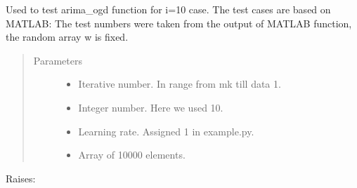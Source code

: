 \documentclass[letterpaper,10pt,english]{sphinxmanual}
\begin{document}
\begin{fulllineitems}
\label{\detokenize{LDS:LDS.OnlineLDS_library.test_arima_ogd}}
\sphinxAtStartPar
Used to test arima\_ogd function for i=10 case.
The test cases are based on MATLAB:
The test numbers were taken from the output of MATLAB function,
the random array w is fixed.
\begin{quote}\begin{description}
\item[{Parameters}] \leavevmode\begin{itemize}
\item {} 
\sphinxAtStartPar
{} \textendash{} Iterative number. In range from mk till data \sphinxhyphen{} 1.

\item {} 
\sphinxAtStartPar
{} \textendash{} Integer number. Here we used 10.

\item {} 
\sphinxAtStartPar
{} \textendash{} Learning rate. Assigned 1 in example.py.

\item {} 
\sphinxAtStartPar
{} \textendash{} Array of 10000 elements.

\end{itemize}

\end{description}\end{quote}

\sphinxAtStartPar
Raises:

\end{fulllineitems}

\end{document}
